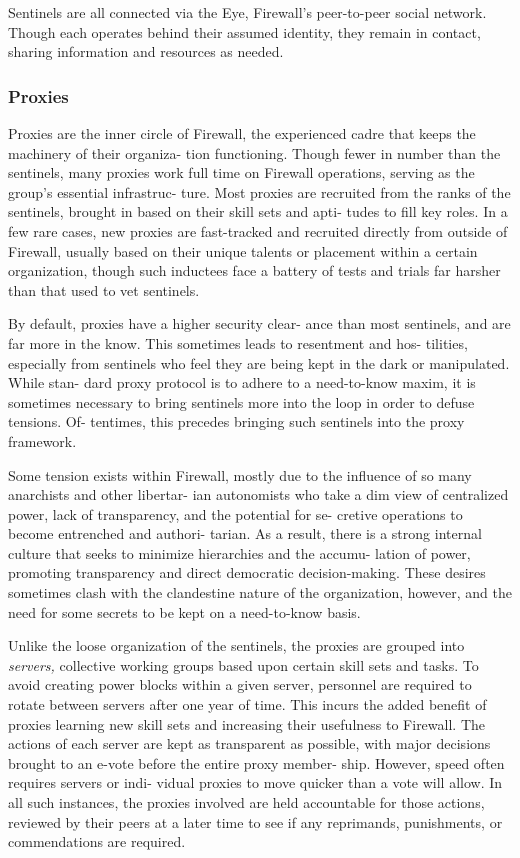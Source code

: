 Sentinels are all connected via the Eye, Firewall's 
peer-to-peer social network. Though each operates 
behind their assumed identity, they remain in contact, 
sharing information and resources as needed. 

\subsubsection{Proxies }

Proxies are the inner circle of Firewall, the experienced 
cadre that keeps the machinery of their organiza-
tion functioning. Though fewer in number than the 
sentinels, many proxies work full time on Firewall 
operations, serving as the group's essential infrastruc-
ture. Most proxies are recruited from the ranks of the 
sentinels, brought in based on their skill sets and apti-
tudes to fill key roles. In a few rare cases, new proxies 
are fast-tracked and recruited directly from outside 
of Firewall, usually based on their unique talents or 
placement within a certain organization, though such 
inductees face a battery of tests and trials far harsher 
than that used to vet sentinels.

By default, proxies have a higher security clear-
ance than most sentinels, and are far more in the 
know. This sometimes leads to resentment and hos-
tilities, especially from sentinels who feel they are 
being kept in the dark or manipulated. While stan-
dard proxy protocol is to adhere to a need-to-know 
maxim, it is sometimes necessary to bring sentinels 
more into the loop in order to defuse tensions. Of-
tentimes, this precedes bringing such sentinels into 
the proxy framework.

Some tension exists within Firewall, mostly due to 
the influence of so many anarchists and other libertar-
ian autonomists who take a dim view of centralized 
power, lack of transparency, and the potential for se-
cretive operations to become entrenched and authori-
tarian. As a result, there is a strong internal culture 
that seeks to minimize hierarchies and the accumu-
lation of power, promoting transparency and direct 
democratic decision-making. These desires sometimes 
clash with the clandestine nature of the organization, 
however, and the need for some secrets to be kept on 
a need-to-know basis. 

Unlike the loose organization of the sentinels, the 
proxies are grouped into \textit{servers,} collective working 
groups based upon certain skill sets and tasks. To 
avoid creating power blocks within a given server, 
personnel are required to rotate between servers 
after one year of time. This incurs the added benefit 
of proxies learning new skill sets and increasing their 
usefulness to Firewall. The actions of each server are 
kept as transparent as possible, with major decisions 
brought to an e-vote before the entire proxy member-
ship. However, speed often requires servers or indi-
vidual proxies to move quicker than a vote will allow. 
In all such instances, the proxies involved are held 
accountable for those actions, reviewed by their peers 
at a later time to see if any reprimands, punishments, 
or commendations are required.

